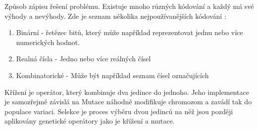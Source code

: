 Způsob zápisu řešení problému. Existuje mnoho různých kódování a každý má své výhody a nevýhody. Zde je seznam několika nejpoužívanějších kódování \cite[s.~42-43]{geneticCZ}:
\begin{enumerate}
	\item Binární - řetězec bitů, který může například reprezentovat jednu nebo více numerických hodnot. 
	\item Realná čísla - Jedno nebo více reálných čísel
	\item Kombinatorické - Může být například seznam čísel označujících 
\end{enumerate}
Křížení je operátor, který kombinuje dva jedince do jednoho. Jeho implementace je samozřejmě závislá na 
Mutace náhodně modifikuje chromozom a zavádí tak do populace variaci.
Selekce je proces výběru dvou jedinců na něž jsou později aplikovány genetické operátory jako je křížení a mutace.  
